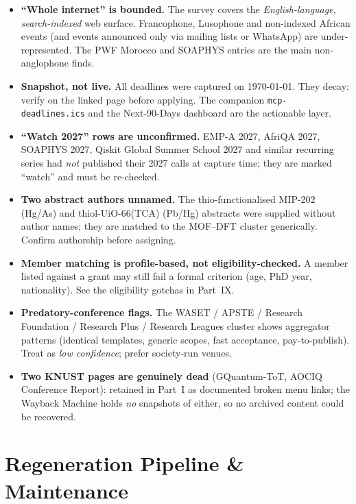 \documentclass[11pt,a4paper]{article}
\begin{document}
\begin{itemize}[leftmargin=1.4em]
  \item \textbf{``Whole internet'' is bounded.} The survey covers the \emph{English-language, search-indexed} web surface. Francophone, Lusophone and non-indexed African events (and events announced only via mailing lists or WhatsApp) are under-represented. The PWF Morocco and SOAPHYS entries are the main non-anglophone finds.
  \item \textbf{Snapshot, not live.} All deadlines were captured on \today. They decay: verify on the linked page before applying. The companion \texttt{mcp-deadlines.ics} and the Next-90-Days dashboard are the actionable layer.
  \item \textbf{``Watch 2027'' rows are unconfirmed.} EMP-A 2027, AfriQA 2027, SOAPHYS 2027, Qiskit Global Summer School 2027 and similar recurring series had \emph{not} published their 2027 calls at capture time; they are marked ``watch'' and must be re-checked.
  \item \textbf{Two abstract authors unnamed.} The thio-functionalised MIP-202 (Hg/As) and thiol-UiO-66(TCA) (Pb/Hg) abstracts were supplied without author names; they are matched to the MOF--DFT cluster generically. Confirm authorship before assigning.
  \item \textbf{Member matching is profile-based, not eligibility-checked.} A member listed against a grant may still fail a formal criterion (age, PhD year, nationality). See the eligibility gotchas in Part~IX.
  \item \textbf{Predatory-conference flags.} The WASET / APSTE / Research Foundation / Research Plus / Research Leagues cluster shows aggregator patterns (identical templates, generic scopes, fast acceptance, pay-to-publish). Treat as \emph{low confidence}; prefer society-run venues.
  \item \textbf{Two KNUST pages are genuinely dead} (GQuantum-ToT, AOCIQ Conference Report): retained in Part~I as documented broken menu links; the Wayback Machine holds \emph{no} snapshots of either, so no archived content could be recovered.
\end{itemize}

\section{Regeneration Pipeline \& Maintenance}
\end{document}
